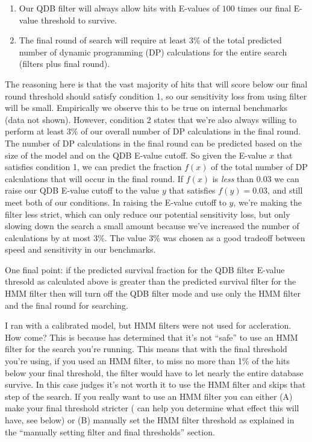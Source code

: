 \begin{enumerate}
\item
Our QDB filter will always allow hits with E-values of $100$ times our
final E-value threshold to survive. 
\item
The final round of search will require at least $3\%$ of the total
predicted number of dynamic programming (DP) calculations for the
entire search (filters plus final round).
\end{enumerate}

The reasoning here is that the vast majority of hits that will score
below our final round threshold should satisfy condition 1, so
our sensitivity loss from using filter will be small. Empirically we
observe this to be true on internal benchmarks (data not shown).
However, condition 2 states that we're also always willing to perform
at least $3\%$ of our overall number of DP calculations in the final
round. The number of DP calculations in the final round can be
predicted based on the size of the model and on the QDB E-value
cutoff. So given the E-value $x$ that satisfies condition 1, we can
predict the fraction $f(x)$ of the total number of DP calculations that will
occur in the final round. If $f(x)$ is \emph{less} than $0.03$ we can
raise our QDB E-value cutoff to the value $y$ that satisfies $f(y) = 0.03$, and
still meet both of our conditions. In raising the E-value cutoff to
$y$, we're making the filter less strict, which can only reduce our
potential sensitivity loss, but only slowing down the search a small
amount because we've increased the number of calculations by at most
$3\%$.  The value $3\%$ was chosen as a good tradeoff between speed
and sensitivity in our benchmarks. 

One final point: if the predicted survival fraction for the QDB filter
E-value thresold as calculated above is greater than the predicted
survival filter for the HMM filter then  will turn off
the QDB filter mode and use only the HMM filter and the final round
for searching.


\begin{srefaq}{I ran  with a calibrated model, but HMM
    filters were not used for accleration. How come?} This is because
     has determined that it's not ``safe'' to use
    an HMM filter for the search you're running. This means that with
    the final threshold you're using, if you used an HMM filter, 
    to miss no more than 1\% of the hits below your final threshold,
    the filter would have to let nearly the entire database
    survive. In this case  judges it's not worth it to
    use the HMM filter and skips that step of the search. If you
    really want to use an HMM filter you can either (A) make your
    final threshold stricter ( can help you determine 
    what effect this will have, see below) or (B) manually set the HMM
    filter threshold as explained in the ``manually setting filter
    and final thresholds'' section.
\end{srefaq}

